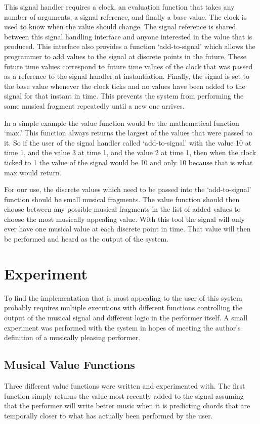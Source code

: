 \documentclass[12pt]{ucthesis}
\begin{document}
{This signal handler requires a clock, an evaluation function that takes any number of arguments, a signal reference, and finally a base value. The clock is used to know when the value should change. The signal reference is shared between this signal handling interface and anyone interested in the value that is produced. This interface also provides a function `add-to-signal' which allows the programmer to add values to the signal at discrete points in the future. These future time values correspond to future time values of the clock that was passed as a reference to the signal handler at instantiation. Finally, the signal is set to the base value whenever the clock ticks and no values have been added to the signal for that instant in time. This prevents the system from performing the same musical fragment repeatedly until a new one arrives. 

In a simple example the value function would be the mathematical function `max.' This function always returns the largest of the values that were passed to it. So if the user of the signal handler called `add-to-signal' with the value 10 at time 1, and the value 3 at time 1, and the value 2 at time 1, then when the clock ticked to 1 the value of the signal would be 10 and only 10 because that is what max would return. 

For our use, the discrete values which need to be passed into the `add-to-signal' function should be small musical fragments. The value function should then choose between any possible musical fragments in the list of added values to choose the most musically appealing value.  With this tool the signal will only ever have one musical value at each discrete point in time. That value will then be performed and heard as the output of the system. 

\chapter{Experiment}
\label {experiment}
To find the implementation that is most appealing to the user of this system probably requires multiple executions with different functions controlling the output of the musical signal and different logic in the performer itself. A small experiment was performed with the system in hopes of meeting the author's definition of a musically pleasing performer. 

\section{Musical Value Functions}
\label {musical-value-functions}
Three different value functions were written and experimented with. The first function simply returns the value most recently added to the signal assuming that the performer will write better music when it is predicting chords that are temporally closer to what has actually been performed by the user. 

}
\end{document}
